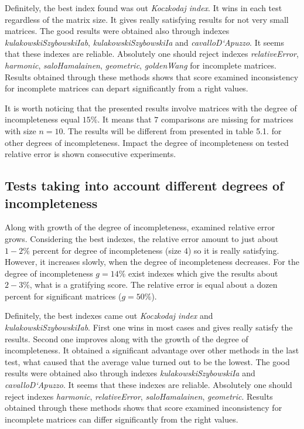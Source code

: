 Definitely, the best index found was out \textit{Koczkodaj index}. It wins in each test regardless of the matrix size. It gives really satisfying results for not very small matrices. The good results were obtained also through indexes \textit{kulakowskiSzybowskiIab}, \textit{kulakowskiSzybowskiIa} and \textit{cavalloD`Apuzzo}. It seems that these indexes are reliable. Absolutely one should reject indexes \textit{relativeError}, \textit{harmonic}, \textit{saloHamalainen}, \textit{geometric}, \textit{goldenWang} for incomplete matrices. Results obtained through these methods shows that score examined inconsistency for incomplete matrices can depart significantly from a right values.

It is worth noticing that the presented results involve matrices with the degree of incompleteness equal $15\%$. It means that $7$ comparisons are missing for matrices with size $n = 10$. The results will be different from presented in table 5.1. for other degrees of incompleteness. Impact the degree of incompleteness on tested relative error is shown consecutive experiments.

\subsection{Tests taking into account different degrees of incompleteness}
Along with growth of the degree of incompleteness, examined relative error grows. Considering the best indexes, the relative error amount to just about $1 - 2\%$ percent for degree of incompleteness (size $4$) so it is really satisfying. However, it increases slowly, when the degree of incompleteness decreases. For the degree of incompleteness $g=14\%$ exist indexes which give the results about $2 - 3 \%$, what is a gratifying score. The relative error is equal about a dozen percent for significant matrices ($g=50\%$).

Definitely, the best indexes came out \textit{Koczkodaj index} and \textit{kulakowskiSzybowskiIab}. First one wins in most cases and gives really satisfy the results. Second one improves along with the growth of the degree of incompleteness. It obtained a significant advantage over other methods in the last test, what caused that the average value turned out to be the lowest. 
The good results were obtained also through indexes \textit{kulakowskiSzybowskiIa} and \textit{cavalloD`Apuzzo}. It seems that these indexes are reliable. Absolutely one should reject indexes \textit{harmonic}, \textit{relativeError}, \textit{saloHamalainen}, \textit{geometric}. Results obtained through these methods shows that score examined inconsistency for incomplete matrices can differ significantly from the right values.

